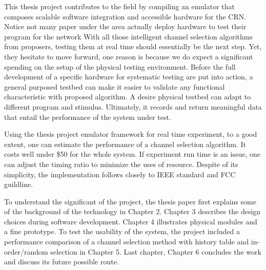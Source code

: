 This thesis project contributes to the field by compiling an emulator that composes scalable software integration and accessible
hardware for the CRN. Notice not many paper under the area actually deploy hardware to test their program for the network 
With all those intelligent channel selection algorithms from proposers, testing them at real time should essentially be the 
next step. Yet, they hesitate to move forward, one reason is because we do expect a significant spending on the setup of the physical 
testing environment. Before the full development of a specific hardware for systematic testing are put into action, a general purposed testbed 
can make it easier to validate any functional characteristic with proposed algorithm. 
A desire physical testbed can adapt to different program and stimulus. Ultimately, it records and return meaningful data that entail the performance of the system under test.

Using the thesis project emulator framework for real time experiment, to a good extent, one can estimate the performance of a channel 
selection algorithm. It costs well under \$50 for the whole system. If experiment run time is an issue, one can adjust
the timing ratio to minimize the uses of resource. Despite of its simplicity, the implementation follows closely to IEEE
standard and FCC guildline.

To understand the significant of the project, the thesis paper first explains some of the background of the technology in Chapter 2.
Chapter 3 describes the design choices during software development. Chapter 4 illustrates physical modules and a fine prototype.
To test the usability of the system, the project included a performance comparison of a channel selection method with history table and in-order/random selection in Chapter 5. Last chapter, Chapter 6 concludes the work and discuss its future possible route. 



